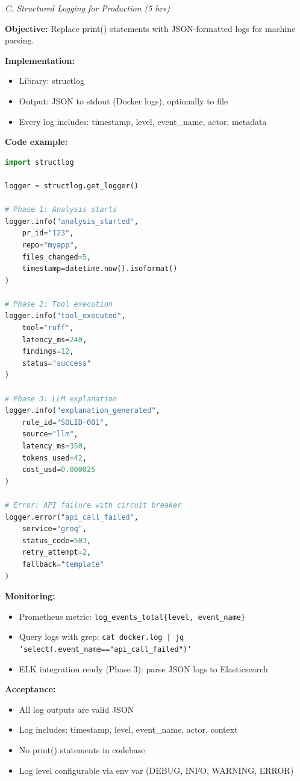 \documentclass[11pt,a4paper]{article}
\begin{document}
\textit{C. Structured Logging for Production (5 hrs)}

\textbf{Objective:} Replace print() statements with JSON-formatted logs for machine parsing.

\textbf{Implementation:}
\begin{itemize}[leftmargin=*]
    \item Library: structlog
    \item Output: JSON to stdout (Docker logs), optionally to file
    \item Every log includes: timestamp, level, event\_name, actor, metadata
\end{itemize}

\textbf{Code example:}
\begin{lstlisting}[language=Python]
import structlog

logger = structlog.get_logger()

# Phase 1: Analysis starts
logger.info("analysis_started",
    pr_id="123",
    repo="myapp",
    files_changed=5,
    timestamp=datetime.now().isoformat()
)

# Phase 2: Tool execution
logger.info("tool_executed",
    tool="ruff",
    latency_ms=240,
    findings=12,
    status="success"
)

# Phase 3: LLM explanation
logger.info("explanation_generated",
    rule_id="SOLID-001",
    source="llm",
    latency_ms=350,
    tokens_used=42,
    cost_usd=0.000025
)

# Error: API failure with circuit breaker
logger.error("api_call_failed",
    service="groq",
    status_code=503,
    retry_attempt=2,
    fallback="template"
)
\end{lstlisting}

\textbf{Monitoring:}
\begin{itemize}[leftmargin=*]
    \item Prometheus metric: \texttt{log\_events\_total\{level, event\_name\}}
    \item Query logs with grep: \texttt{cat docker.log | jq 'select(.event\_name=="api\_call\_failed")'}
    \item ELK integration ready (Phase 3): parse JSON logs to Elasticsearch
\end{itemize}

\textbf{Acceptance:}
\begin{itemize}[leftmargin=*]
    \item[$\checkmark$] All log outputs are valid JSON
    \item[$\checkmark$] Log includes: timestamp, level, event\_name, actor, context
    \item[$\checkmark$] No print() statements in codebase
    \item[$\checkmark$] Log level configurable via env var (DEBUG, INFO, WARNING, ERROR)
\end{itemize}
\end{document}

